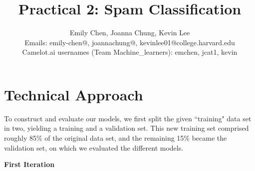 \documentclass[11pt]{article}
\title{Practical 2: Spam Classification}
\author{Emily Chen, Joanna Chung, Kevin Lee \\
Emails: emily-chen@, joannachung@, kevinlee01@college.harvard.edu \\
Camelot.ai usernames (Team Machine\_learners): emchen, jcat1, kevin}
\begin{document}
\maketitle{}

\section{Technical Approach}

To construct and evaluate our models, we first split the given ``training" data set in two, yielding a training and a validation set. This new training set comprised roughly 85\% of the original data set, and the remaining 15\% became the validation set, on which we evaluated the different models.

\begin{center}
      \textbf{First Iteration}
  \end{center}
  
\end{document}
